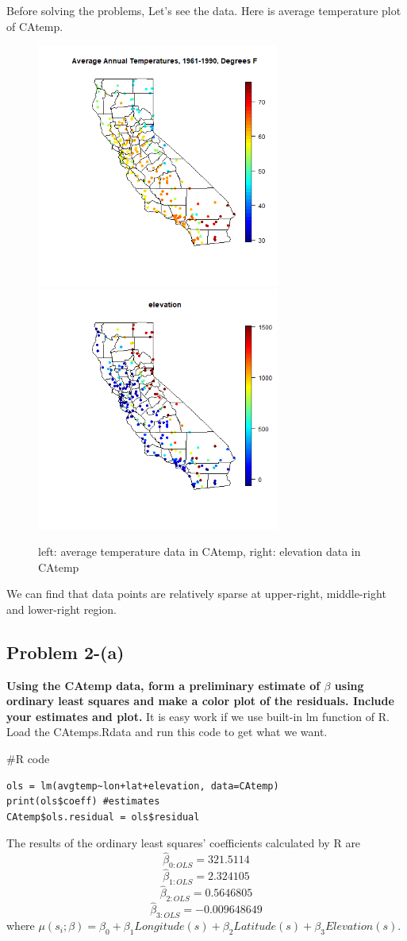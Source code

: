 \documentclass{article}
\newenvironment{Rcode}%
{%
    \begin{mdframed}
    \#R code
    \begin{small}
}
{%
    \end{small}
    \end{mdframed}
}
\begin{document}
Before solving the problems, Let's see the data. Here is average temperature plot of CAtemp.
\begin{figure}[!h]
    \centering
    \includegraphics[height=8cm]{prob2_CAtemp_avgtemp.png}
    \includegraphics[height=8cm]{prob2_CAtemp_elevation.png}
    \caption{left: average temperature data in CAtemp, right: elevation data in CAtemp}
\end{figure}
We can find that data points are relatively sparse at upper-right, middle-right and lower-right region.


\clearpage
\subsection{Problem 2-(a)}
\textbf{
Using the CAtemp data, form a preliminary estimate of $\beta$ using ordinary least squares 
and make a color plot of the residuals.
Include your estimates and plot.
}
It is easy work if we use built-in lm function of R.
Load the CAtemps.Rdata and run this code to get what we want.
\begin{Rcode}
    \begin{verbatim}
ols = lm(avgtemp~lon+lat+elevation, data=CAtemp)
print(ols$coeff) #estimates
CAtemp$ols.residual = ols$residual
    \end{verbatim}
\end{Rcode}
The results of the ordinary least squares' coefficients calculated by R are
\[\hat{\beta}_{0:OLS}=321.5114\]
\[\hat{\beta}_{1:OLS}=2.324105\]
\[\hat{\beta}_{2:OLS}=0.5646805\]
\[\hat{\beta}_{3:OLS}=-0.009648649\]
where \(\mu(s_i;\beta)=\beta_0+\beta_1 Longitude(s) + \beta_2 Latitude(s)+\beta_3 Elevation(s)\).
\end{document}
